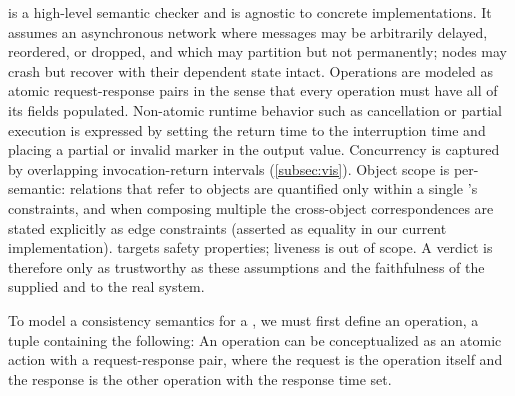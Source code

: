 \sysname{} is a high-level semantic checker and is agnostic to concrete
implementations. It assumes an asynchronous network where messages may be
arbitrarily delayed, reordered, or dropped, and which may partition but not
permanently; nodes may crash but recover with their dependent state intact.
Operations are modeled as atomic request-response pairs in the sense that every
operation must have all of its fields populated. Non-atomic runtime behavior
such as cancellation or partial execution is expressed by setting the return
time to the interruption time and placing a partial or invalid marker in the
output value. Concurrency is captured by overlapping invocation-return intervals
(\cref{subsec:vis}). Object scope is per-semantic: relations that refer to
objects are quantified only within a single \sysmod{}'s constraints, and when
composing multiple \sysmods{} the cross-object correspondences are stated
explicitly as edge constraints (asserted as equality in our current
implementation). \sysname{} targets safety properties; liveness is out of scope.
A \sysname{} verdict is therefore only as trustworthy as these assumptions and
the faithfulness of the supplied \sysmods{} and \sysgraph{} to the real system.

To model a consistency semantics for a \sysmod{}, we must first define an
operation, a tuple containing the following:
An operation
can be conceptualized as an atomic action with a
request-response pair, where the request
is the operation itself and the response is the other operation with the
response time set.

